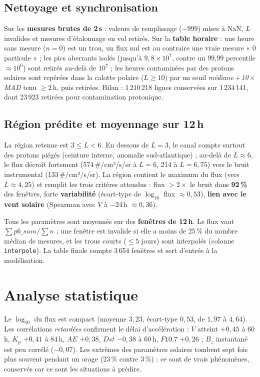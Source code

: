 \documentclass[11pt,a4paper]{article}
\begin{document}
\subsection{Nettoyage et synchronisation}
Sur les \textbf{mesures brutes de 2\,s} : valeurs de remplissage ($-999$) mises à NaN, $L$
invalides et mesures d'étalonnage en vol retirés. Sur la \textbf{table horaire} : une heure sans
mesure ($n=0$) est un trou, un flux nul est au contraire une vraie mesure « 0 particule » ; les
pics aberrants isolés (jusqu'à $9{,}8\times10^{7}$, contre un 99,99\ieme{} percentile
$\approx 10^{6}$) sont retirés au-delà de $10^{7}$ ; les heures contaminées par des protons
solaires sont repérées dans la calotte polaire ($L\ge 10$) par un seuil
\emph{médiane\,+\,10\,$\times$MAD} tenu $\ge 2$\,h, puis retirées. Bilan : 1\,210\,218 lignes
conservées sur 1\,234\,141, dont 23\,923 retirées pour contamination protonique.

\subsection{Région prédite et moyennage sur 12\,h}
La région retenue est $3 \le L < 6$. En dessous de $L=3$, le canal compte surtout des protons
piégés (ceinture interne, anomalie sud-atlantique) ; au-delà de $L\approx 6$, le flux décroît
fortement (574\,\#/cm²/s/sr à $L=6$, 214 à $L=6{,}75$) vers le bruit instrumental
(133\,\#/cm²/s/sr). La région contient le maximum du flux (vers $L\approx 4{,}25$) et remplit les
trois critères attendus : flux $>2\times$ le bruit dans \textbf{92\,\%} des fenêtres, forte
\textbf{variabilité} (écart-type de $\log_{10}$ flux $\approx 0{,}53$), \textbf{lien avec le vent
solaire} (Spearman avec $V$ à $-24$\,h $\approx 0{,}36$).

Tous les paramètres sont moyennés sur des \textbf{fenêtres de 12\,h}. Le flux vaut
$\sum p6\_sum / \sum n$ ; une fenêtre est invalide si elle a moins de 25\,\% du nombre médian de
mesures, et les trous courts ($\le 5$ jours) sont interpolés (colonne \texttt{interpole}). La
table finale compte 3\,654 fenêtres et sert d'entrée à la modélisation.

\section{Analyse statistique}

Le $\log_{10}$ du flux est compact (moyenne $3{,}23$, écart-type $0{,}53$, de $1{,}97$ à
$4{,}64$). Les corrélations \emph{retardées} confirment le délai d'accélération : $V$ atteint
$+0{,}45$ à 60\,h, $K_p$ $+0{,}41$ à 84\,h, $AE$ $+0{,}38$, $Dst$ $-0{,}38$ à 60\,h, $F10.7$
$+0{,}26$ ; $B_z$ instantané est peu corrélé ($-0{,}07$). Les extrêmes des paramètres solaires
tombent sept fois plus souvent pendant un orage (23\,\% contre 3\,\%) : ce sont de vrais
phénomènes, conservés car ce sont les situations à prédire.
\end{document}
